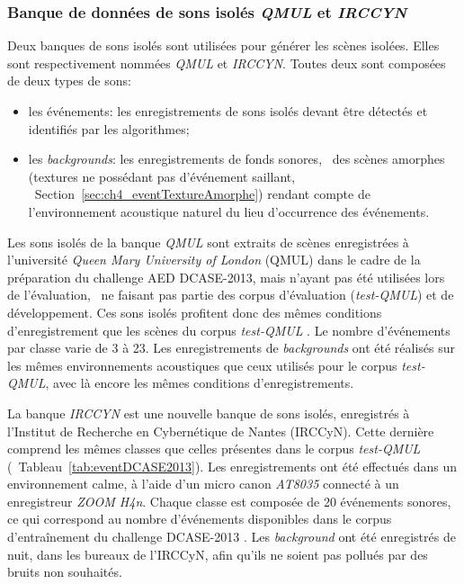\subsubsection{Banque de données de sons isolés \emph{QMUL} et \emph{IRCCYN}}
\label{sec:ch7_eventDataset}

Deux banques de sons isolés sont utilisées pour générer les scènes isolées. Elles sont respectivement nommées \emph{QMUL} et \emph{IRCCYN}. Toutes deux sont composées de deux types de sons:

\begin{itemize}
\item les événements: les enregistrements de sons isolés devant être détectés et identifiés par les algorithmes;
\item les \emph{backgrounds}: les enregistrements de fonds sonores, \ie~des scènes amorphes (textures ne possédant pas d'événement saillant, \cf~Section~\ref{sec:ch4_eventTextureAmorphe}) rendant compte de l’environnement acoustique naturel du lieu d'occurrence des événements. 
\end{itemize}

Les sons isolés de la banque \emph{QMUL} sont extraits de scènes enregistrées à l'université \emph{Queen Mary University of London} (QMUL) dans le cadre de la préparation du challenge AED DCASE-2013, mais n'ayant pas été utilisées lors de l'évaluation, \ie~ne faisant pas partie des corpus d'évaluation (\emph{test-QMUL}) et de développement. Ces sons isolés profitent donc des mêmes conditions d’enregistrement que les scènes du corpus \emph{test-QMUL} \citep{Giannoulis2013database}. Le nombre d'événements par classe varie de 3 à 23. Les enregistrements de \emph{backgrounds} ont été réalisés sur les mêmes environnements acoustiques que ceux utilisés pour le corpus \emph{test-QMUL}, avec là encore les mêmes conditions d'enregistrements.

La banque \emph{IRCCYN} est une nouvelle banque de sons isolés, enregistrés à l'Institut de Recherche en Cybernétique de Nantes (IRCCyN). Cette dernière comprend les mêmes classes que celles présentes dans le corpus \emph{test-QMUL} (\cf~Tableau~\ref{tab:eventDCASE2013}). Les enregistrements ont été effectués dans un environnement calme, à l'aide d'un micro canon \emph{AT8035} connecté à un enregistreur \emph{ZOOM H4n}. Chaque classe est composée de 20 événements sonores, ce qui correspond au nombre d'événements disponibles dans le corpus d'entraînement du challenge DCASE-2013 \citep{Giannoulis2013database,giannoulis2013detection}. Les \emph{background} ont été enregistrés de nuit, dans les bureaux de l'IRCCyN, afin qu'ils ne soient pas pollués par des bruits non souhaités. \\

